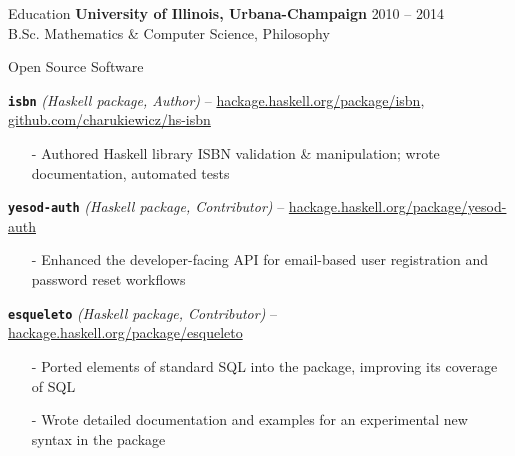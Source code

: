 \documentclass{resume} %
\begin{document}

\begin{rSection}{Education}
{\bf University of Illinois, Urbana-Champaign} \hfill {\textsc{2010 -- 2014}} \\
B.Sc. Mathematics \& Computer Science, Philosophy
\end{rSection}


\begin{rSection}{Open Source Software}

\begin{rListSection}
\item \textbf{\texttt{isbn}} {\em (Haskell package, Author)} -- \href{https://hackage.haskell.org/package/isbn}{hackage.haskell.org/package/isbn}, \href{https://github.com/charukiewicz/hs-isbn}{github.com/charukiewicz/hs-isbn}
    \begin{itemize} \itemsep -0.5em \vspace{-0.5em}
            \item[-] Authored Haskell library ISBN validation \& manipulation; wrote documentation, automated tests
    \end{itemize}
\item \textbf{\texttt{yesod-auth}} {\em (Haskell package, Contributor)} -- \href{https://hackage.haskell.org/package/yesod-auth}{hackage.haskell.org/package/yesod-auth}
    \begin{itemize} \itemsep -0.5em \vspace{-0.5em}
    \item[-] Enhanced the developer-facing API for email-based user registration and password reset workflows
    \end{itemize}
\item \textbf{\texttt{esqueleto}} {\em (Haskell package, Contributor)} -- \href{https://hackage.haskell.org/package/esqueleto}{hackage.haskell.org/package/esqueleto}
    \begin{itemize} \itemsep -0.5em \vspace{-0.5em}
    \item[-] Ported elements of standard SQL into the package, improving its coverage of SQL
    \item[-] Wrote detailed documentation and examples for an experimental new syntax in the package
    \end{itemize}
\end{rListSection}

\end{rSection}
\end{document}
